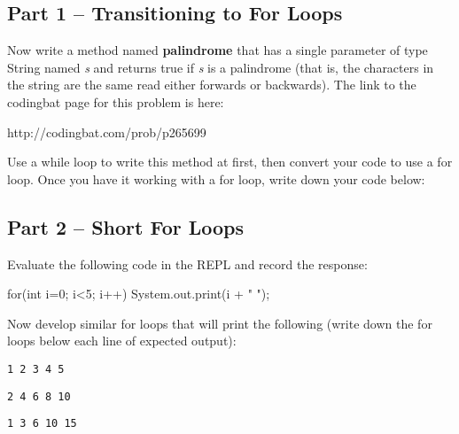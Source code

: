 \subsection{Part 1 -- Transitioning to For Loops}

\begin{exer}
Now write a method named \textbf{palindrome} that has a single parameter of type String named \textit{s} and returns true if \textit{s} is a palindrome (that is, the characters in the string are the same read either forwards or backwards).  The link to the codingbat page for this problem is here:

http://codingbat.com/prob/p265699

Use a while loop to write this method at first, then convert your code to use a for loop. Once you have it working with a for loop, write down your code below:

\evallinesix
\end{exer}

\initialbox

\subsection{Part 2 -- Short For Loops}

\begin{exer}
Evaluate the following code in the REPL and record the response:

\begin{code}
for(int i=0; i<5; i++) 
  System.out.print(i + " ");
\end{code}
\evalline
\end{exer}

\begin{eval}
Now develop similar for loops that will print the following (write down the for loops below each line of expected output):
\begin{sevalenum}

\item \begin{verbatim}1 2 3 4 5\end{verbatim}

\evallinetwo

\item \begin{verbatim}2 4 6 8 10\end{verbatim}

\evallinetwo

\item \begin{verbatim}1 3 6 10 15\end{verbatim}

\evallinefour

\end{sevalenum}
\end{eval}



